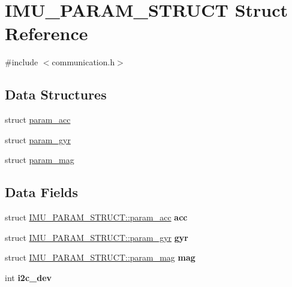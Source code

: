 \hypertarget{structIMU__PARAM__STRUCT}{
\section{IMU\_\-PARAM\_\-STRUCT Struct Reference}
\label{structIMU__PARAM__STRUCT}
}


{\ttfamily \#include $<$communication.h$>$}

\subsection*{Data Structures}
\begin{DoxyCompactItemize}
\item 
struct \hyperlink{structIMU__PARAM__STRUCT_1_1param__acc}{param\_\-acc}
\item 
struct \hyperlink{structIMU__PARAM__STRUCT_1_1param__gyr}{param\_\-gyr}
\item 
struct \hyperlink{structIMU__PARAM__STRUCT_1_1param__mag}{param\_\-mag}
\end{DoxyCompactItemize}
\subsection*{Data Fields}
\begin{DoxyCompactItemize}
\item 
\hypertarget{structIMU__PARAM__STRUCT_a92172e4757d0f8f9135a659e406c12e5}{
struct \hyperlink{structIMU__PARAM__STRUCT_1_1param__acc}{IMU\_\-PARAM\_\-STRUCT::param\_\-acc} {\bfseries acc}}
\label{structIMU__PARAM__STRUCT_a92172e4757d0f8f9135a659e406c12e5}

\item 
\hypertarget{structIMU__PARAM__STRUCT_a5a4557868f1af679a1098808397b02ec}{
struct \hyperlink{structIMU__PARAM__STRUCT_1_1param__gyr}{IMU\_\-PARAM\_\-STRUCT::param\_\-gyr} {\bfseries gyr}}
\label{structIMU__PARAM__STRUCT_a5a4557868f1af679a1098808397b02ec}

\item 
\hypertarget{structIMU__PARAM__STRUCT_a26b277dcaf05f3842995df888225f6f4}{
struct \hyperlink{structIMU__PARAM__STRUCT_1_1param__mag}{IMU\_\-PARAM\_\-STRUCT::param\_\-mag} {\bfseries mag}}
\label{structIMU__PARAM__STRUCT_a26b277dcaf05f3842995df888225f6f4}

\item 
\hypertarget{structIMU__PARAM__STRUCT_a8a870f383fc9ba0b682fdc9b8c0d2734}{
int {\bfseries i2c\_\-dev}}
\label{structIMU__PARAM__STRUCT_a8a870f383fc9ba0b682fdc9b8c0d2734}

\end{DoxyCompactItemize}


